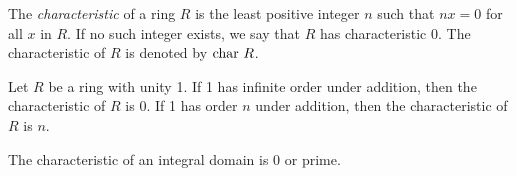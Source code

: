 
\begin{definition}
	The \textit{characteristic} of a ring $R$ is the least positive integer $n$ such that $nx = 0$ for all $x$ in $R$. If no such integer exists, we say that $R$ has characteristic 0. The characteristic of $R$ is denoted by $\text{char } R$.
\end{definition}

\begin{theorem}
	Let $R$ be a ring with unity 1. If 1 has infinite order under addition, then the characteristic of $R$ is 0. If 1 has order $n$ under addition, then the characteristic of $R$ is $n$.
\end{theorem}

\begin{theorem}
	The characteristic of an integral domain is 0 or prime.
\end{theorem}
